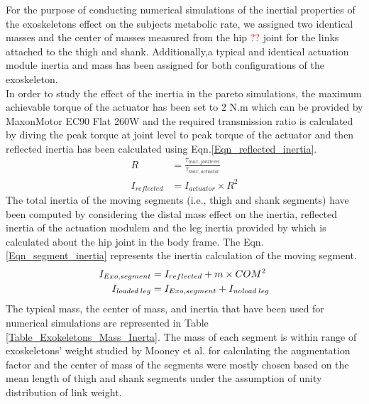 \documentclass[10pt,letterpaper]{article}
\begin{document}
For the purpose of conducting numerical simulations of the inertial properties of the exoskeletons effect on the subjects metabolic rate, we assigned two identical masses and the center of masses measured from the hip \textcolor{red}{??} joint for the links attached to the thigh and shank. Additionally,a typical and identical actuation module inertia and mass has been assigned for both configurations of the exoskeleton.\\
In order to study the effect of the inertia in the pareto simulations, the maximum achievable torque of the actuator has been set to 2 N.m which can be provided by MaxonMotor EC90 Flat 260W and the required transmission ratio is calculated by diving the peak torque at joint level to peak torque of the actuator and then reflected inertia has been calculated using Eqn.\eqref{Eqn_reflected_inertia}.\\
\begin{equation}\label{Eqn_reflected_inertia}
\begin{aligned}
R &= \frac{\tau_{max,jont level}}{\tau_{max,actuator}}\\
I_{reflected} &= I_{actuator}\times R^{2}
\end{aligned}
\end{equation}
The total inertia of the moving segments (i.e., thigh and shank segments) have been computed by considering the distal mass effect on the inertia, reflected inertia of the actuation modulem and the leg inertia provided by \cite{133} which is calculated about the hip joint in the body frame. The Eqn.\eqref{Eqn_segment_inertia} represents the inertia calculation of the moving segment.
\begin{equation}\label{Eqn_segment_inertia}
\begin{aligned}
I_{Exo,segment} &= I_{reflected} + m\times COM^{2}\\
I_{\textit{loaded}\;leg} &= I_{Exo,segment} + I_{\textit{\textit{noload}}\;leg}
\end{aligned}
\end{equation}
The typical mass, the center of mass, and inertia that have been used for numerical simulations are represented in Table \ref{Table_Exokeletons_Mass_Inerta}. The mass of each segment is within range of exoskeletons' weight studied by Mooney et al.\cite{41} for calculating the augmentation factor and the center of mass of the segments were mostly chosen based on the mean length of thigh and shank segments\cite{136} under the assumption of unity distribution of link weight.\\ 
\end{document}
